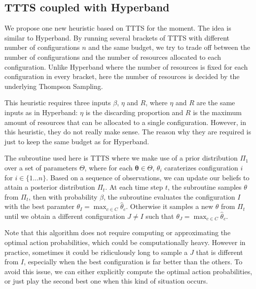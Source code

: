 \documentclass[runningheads,a4paper]{llncs}
\begin{document}
\subsection{TTTS coupled with Hyperband}

We propose one new heuristic based on TTTS for the moment. The idea is similar to Hyperband. By running several brackets of TTTS with different number of configurations $n$ and the same budget, we try to trade off between the number of configurations and the number of resources allocated to each configuration. Unlike Hyperband where the number of resources is fixed for each configuration in every bracket, here the number of resources is decided by the underlying Thompson Sampling.

This heuristic requires three inputs $\beta$, $\eta$ and $R$, where $\eta$ and $R$ are the same inputs as in Hyperband: $\eta$ is the discarding proportion and $R$ is the maximum amount of resources that can be allocated to a single configuration. However, in this heuristic, they do not really make sense. The reason why they are required is just to keep the same budget as for Hyperband. 

The subroutine used here is TTTS where we make use of a prior distribution $\Pi_1$ over a set of parameters $\Theta$, where for each $\mathbf{\theta}\in\Theta$, $\theta_i$ caraterizes configuration $i$ for $i\in\{1\ldots n\}$. Based on a sequence of observations, we can update our beliefs to attain a posterior distribution $\Pi_t$. At each time step $t$, the subroutine samples $\theta$ from $\Pi_t$, then with probability $\beta$, the subroutine evaluates the configuration $I$ with the best paramter $\theta_I = \max_{c\in C}\hat{\theta}_c$. Otherwise it samples a new $\theta$ from $\Pi_t$ until we obtain a different configuration $J\neq I$ such that $\theta_J = \max_{c\in C}\hat{\theta}_c$.

\begin{remark}
Note that this algorithm does not require computing or approximating the optimal action probabilities, which could be computationally heavy. However in practice, sometimes it could be ridiculously long to sample a $J$ that is different from $I$, especially when the best configuration is far better than the others. To avoid this issue, we can either explicitly compute the optimal action probabilities, or just play the second best one when this kind of situation occurs.
\end{remark}
\end{document}
